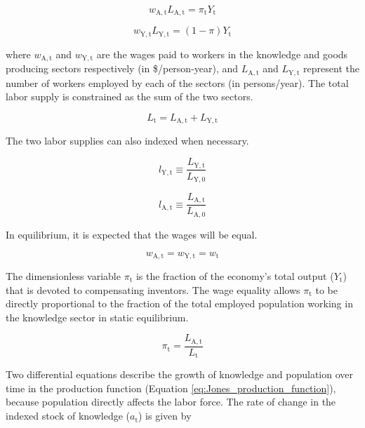 \documentclass[letterpaper,12pt]{article}
\begin{document}
\begin{equation} \label{eq:knowledge_comp}
	w_\mathrm{A,t} L_\mathrm{A,t} = \pi_\mathrm{t} Y_\mathrm{t}
\end{equation}

\begin{equation} \label{eq:labor_comp}
	w_\mathrm{Y,t} L_\mathrm{Y,t} = (1-\pi) Y_\mathrm{t}
\end{equation}

\noindent where $w_\mathrm{A,t}$ and $w_\mathrm{Y,t}$ are the wages paid to workers in the knowledge and goods producing sectors respectively (in \$/person-year), and $L_\mathrm{A,t}$ and $L_\mathrm{Y,t}$ represent the number of workers employed by each of the sectors (in persons/year). The total labor supply is constrained as the sum of the two sectors.

\begin{equation} \label{labor_supply}
	L_\mathrm{t} = L_\mathrm{A,t} + L_\mathrm{Y,t}
\end{equation}

The two labor supplies can also indexed when necessary.

\begin{equation}
	l_\mathrm{Y,t} \equiv \frac{L_\mathrm{Y,t}}{L_\mathrm{Y,0}}
\end{equation}

\begin{equation}
	l_\mathrm{A,t} \equiv \frac{L_\mathrm{A,t}}{L_\mathrm{A,0}}
\end{equation}

In equilibrium, it is expected that the wages will be equal.

\begin{equation} \label{eq:wage_equality}
	w_\mathrm{A,t} = w_\mathrm{Y,t} = w_\mathrm{t}
\end{equation}

The dimensionless variable $\pi_\mathrm{t}$ is the fraction of the economy's total output ($Y_\mathrm{t}$) that is devoted to compensating inventors. The wage equality allows $\pi_\mathrm{t}$ to be directly proportional to the fraction of the total employed population working in the knowledge sector in static equilibrium.

\begin{equation} \label{eq:pi}
	\pi_\mathrm{t} = \frac{L_\mathrm{A,t}}{L_\mathrm{t}}
\end{equation}

Two differential equations describe the growth of knowledge and population over time in the production function (Equation \ref{eq:Jones_production_function}), because population directly affects the labor force. The rate of change in the indexed stock of knowledge ($a_{\mathrm{t}}$) is given by
\end{document}

